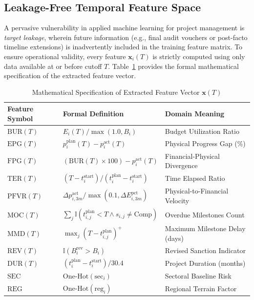 \documentclass[conference]{IEEEtran}
\begin{document}
\subsection{Leakage-Free Temporal Feature Space}
A pervasive vulnerability in applied machine learning for project management is \textit{target leakage}, wherein future information (e.g., final audit vouchers or post-facto timeline extensions) is inadvertently included in the training feature matrix. To ensure operational validity, every feature $\mathbf{x}_i(T)$ is strictly computed using only data available at or before cutoff $T$. Table~\ref{tab_features} provides the formal mathematical specification of the extracted feature vector.

\begin{table}[htbp]
\caption{Mathematical Specification of Extracted Feature Vector $\mathbf{x}(T)$}
\begin{center}
\begin{tabular}{lll}
\toprule
\textbf{Feature Symbol} & \textbf{Formal Definition} & \textbf{Domain Meaning} \\
\midrule
$\text{BUR}(T)$ & $E_i(T) / \max(1.0, B_i)$ & Budget Utilization Ratio \\
$\text{EPG}(T)$ & $p_i^{\text{plan}}(T) - p_i^{\text{act}}(T)$ & Physical Progress Gap (\%) \\
$\text{FPG}(T)$ & $(\text{BUR}(T) \times 100) - p_i^{\text{act}}(T)$ & Financial-Physical Divergence \\
$\text{TER}(T)$ & $(T - t_i^{\text{start}}) / (t_i^{\text{plan}} - t_i^{\text{start}})$ & Time Elapsed Ratio \\
$\text{PFVR}(T)$ & $\Delta p_{i,3m}^{\text{act}} / \max(0.1, \Delta E_{i,3m}^{\text{pct}})$ & Physical-to-Financial Velocity \\
$\text{MOC}(T)$ & $\sum_{j} \mathbb{I}(t_{i,j}^{\text{plan}} < T \land s_{i,j} \neq \text{Comp})$ & Overdue Milestones Count \\
$\text{MMD}(T)$ & $\max_{j}(T - t_{i,j}^{\text{plan}})^+$ & Maximum Milestone Delay (days) \\
$\text{REV}(T)$ & $\mathbb{I}(B_i^{\text{rev}} > B_i)$ & Revised Sanction Indicator \\
$\text{DUR}(T)$ & $(t_i^{\text{plan}} - t_i^{\text{start}}) / 30.4$ & Project Duration (months) \\
$\text{SEC}$ & $\text{One-Hot}(\text{sec}_i)$ & Sectoral Baseline Risk \\
$\text{REG}$ & $\text{One-Hot}(\text{reg}_i)$ & Regional Terrain Factor \\
\bottomrule
\end{tabular}
\label{tab_features}
\end{center}
\end{table}
\end{document}
